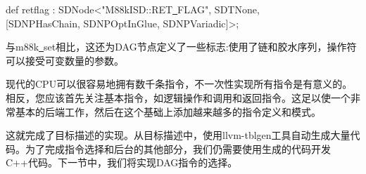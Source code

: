 \begin{tcolorbox}[colback=white,colframe=black]
def retflag : SDNode<"M88kISD::RET\underline{~}FLAG", SDTNone, \\
\hspace*{3cm}[SDNPHasChain, SDNPOptInGlue, SDNPVariadic]>;
\end{tcolorbox}

与m88k\underline{~}set相比，这还为DAG节点定义了一些标志:使用了链和胶水序列，操作符可以接受可变数量的参数。\par

\begin{tcolorbox}[colback=blue!5!white,colframe=blue!75!black, title=以迭代的方式实现指令]
	
现代的CPU可以很容易地拥有数千条指令，不一次性实现所有指令是有意义的。相反，您应该首先关注基本指令，如逻辑操作和调用和返回指令。这足以使一个非常基本的后端工作，然后在这个基础上添加越来越多的指令定义和模式。
\end{tcolorbox}

这就完成了目标描述的实现。从目标描述中，使用llvm-tblgen工具自动生成大量代码。为了完成指令选择和后台的其他部分，我们仍需要使用生成的代码开发C++代码。下一节中，我们将实现DAG指令的选择。\par





















